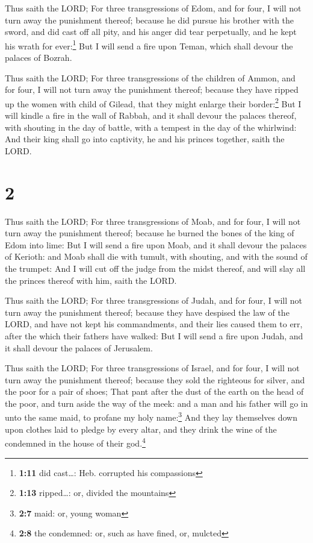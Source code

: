  Thus saith the LORD; For three transgressions of Edom,
and for four, I will not turn away the punishment thereof; because he
did pursue his brother with the sword, and did cast off all pity, and
his anger did tear perpetually, and he kept his wrath for
ever:\footnote{\textbf{1:11} did cast\ldots: Heb. corrupted his
  compassions}  But I will send a fire upon Teman, which
shall devour the palaces of Bozrah.

 Thus saith the LORD; For three transgressions of the
children of Ammon, and for four, I will not turn away the punishment
thereof; because they have ripped up the women with child of Gilead,
that they might enlarge their border:\footnote{\textbf{1:13}
  ripped\ldots: or, divided the mountains}  But I will
kindle a fire in the wall of Rabbah, and it shall devour the palaces
thereof, with shouting in the day of battle, with a tempest in the day
of the whirlwind:  And their king shall go into
captivity, he and his princes together, saith the LORD.

\hypertarget{section-1}{%
\section{2}\label{section-1}}

 Thus saith the LORD; For three transgressions of Moab,
and for four, I will not turn away the punishment thereof; because he
burned the bones of the king of Edom into lime:  But I
will send a fire upon Moab, and it shall devour the palaces of Kerioth:
and Moab shall die with tumult, with shouting, and with the sound of the
trumpet:  And I will cut off the judge from the midst
thereof, and will slay all the princes thereof with him, saith the LORD.

 Thus saith the LORD; For three transgressions of Judah,
and for four, I will not turn away the punishment thereof; because they
have despised the law of the LORD, and have not kept his commandments,
and their lies caused them to err, after the which their fathers have
walked:  But I will send a fire upon Judah, and it shall
devour the palaces of Jerusalem.

 Thus saith the LORD; For three transgressions of Israel,
and for four, I will not turn away the punishment thereof; because they
sold the righteous for silver, and the poor for a pair of shoes;
 That pant after the dust of the earth on the head of the
poor, and turn aside the way of the meek: and a man and his father will
go in unto the same maid, to profane my holy name:\footnote{\textbf{2:7}
  maid: or, young woman}  And they lay themselves down
upon clothes laid to pledge by every altar, and they drink the wine of
the condemned in the house of their god.\footnote{\textbf{2:8} the
  condemned: or, such as have fined, or, mulcted}

